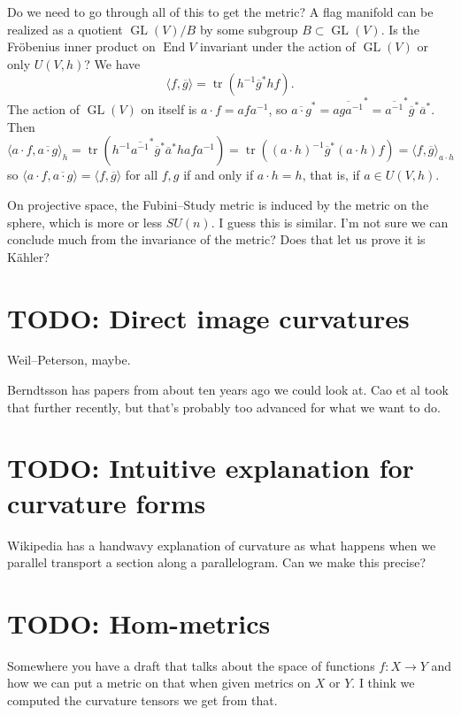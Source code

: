\documentclass[10pt,a4paper]{article}
\def\ov#1{\overline{#1}}
\DeclareMathOperator{\GL}{GL}
\DeclareMathOperator{\End}{End}
\DeclareMathOperator{\tr}{tr}
\begin{document}
Do we need to go through all of this to get the metric? A flag manifold can be realized as a quotient $\GL(V) / B$ by some subgroup $B \subset \GL(V)$. Is the Fr\"obenius inner product on $\End V$ invariant under the action of $\GL(V)$ or only $U(V,h)$? We have
\[
\langle f, \ov g \rangle
= \tr(h^{-1} \ov g^* h f).
\]
The action of $\GL(V)$ on itself is $a \cdot f = a f a^{-1}$, so $\ov{a \cdot g}^* = \ov{a g a^{-1}}^* = \ov{a^{-1}}^* \ov g^* \ov a^*$. Then
\[
\langle a \cdot f, \ov{a \cdot g} \rangle_h
= \tr(h^{-1} \ov{a^{-1}}^* \ov g^* \ov a^* h a f a^{-1})
= \tr((a \cdot h)^{-1} \ov g^* (a \cdot h) f)
= \langle f, \ov{g} \rangle_{a \cdot h}
\]
so $\langle a \cdot f, \ov{a \cdot g} \rangle = \langle f, \ov g \rangle$ for all $f,g$ if and only if $a \cdot h = h$, that is, if $a \in U(V,h)$.

On projective space, the Fubini--Study metric is induced by the metric on the sphere, which is more or less $SU(n)$. I guess this is similar. I'm not sure we can conclude much from the invariance of the metric? Does that let us prove it is K\"ahler?



\section{TODO: Direct image curvatures}
\label{sec:org5619e67}

Weil--Peterson, maybe.

Berndtsson \cite{berndtsson2009curvature} has papers from about ten years ago we could look at. Cao et al took that further recently, but that's probably too advanced for what we want to do.


\section{TODO: Intuitive explanation for curvature forms}
\label{sec:org2b43ecb}

Wikipedia has a handwavy explanation of curvature as what happens when we parallel transport a section along a parallelogram. Can we make this precise?



\section{TODO: Hom-metrics}

Somewhere you have a draft that talks about the space of functions $f : X \to Y$ and how we can put a metric on that when given metrics on $X$ or $Y$. I think we computed the curvature tensors we get from that.
\end{document}
